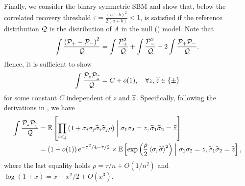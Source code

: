 Finally, we consider the binary symmetric SBM and show that,
below the correlated recovery threshold $\tau=\frac{(a-b)^2}{2(a+b)}<1$, 
  is satisfied if the reference distribution $\mathcal{Q}$ is the distribution of $A$ in
the null (\ER) model. Note that 
$$
\int  \frac{  \left( \mathcal{P}_{+} - \mathcal{P}_{-} \right)^2 }{\mathcal{Q} }  =
\int \frac{\mathcal{P}^2_{+}}{\mathcal{Q}} +\int \frac{\mathcal{P}^2_{-}}{\mathcal{Q}} - 2 \int \frac{ \mathcal{P}_{+} \mathcal{P}_{-} }{ \mathcal{Q}}.
$$
Hence, it is sufficient to show
$$
 \int \frac{ \mathcal{P}_{z} \mathcal{P}_{\widetilde{z} } }{ \mathcal{Q}} =  
C+o(1), \quad  \forall z, \widetilde{z} \in \{\pm \}
$$
for some constant $C$ independent of $z$ and ${\widetilde{z}}$.
Specifically, following the derivations in ,
we have
\begin{align}
\int \frac{   \mathcal{P}_{z}  \mathcal{P}_{{\widetilde{z}}} }{ \mathcal{Q} } 
&= \mathbb{E} \left[   \prod_{i < j} \left(1 +  \sigma_i \sigma_j \widetilde{\sigma}_i \widetilde{\sigma}_j \rho \right)
\mathrel{\bigg|} \sigma_1 \sigma_2=z, \widetilde{\sigma}_1 \widetilde{\sigma}_2 ={\widetilde{z}}  \right]  \nonumber \\
& =  \left( 1+o(1) \right) e^{ -\tau^2/4 -\tau/2} \times 
\mathbb{E} \left[  \exp \left( \frac{\rho}{2} \left \langle  \sigma, \widetilde{\sigma} \right\rangle^2  \right) \mathrel{\Big|} \sigma_1 \sigma_2=z, \widetilde{\sigma}_1 \widetilde{\sigma}_2 ={\widetilde{z}}  \right],
\end{align}
where the last equality holds $\rho=\tau/n + O(1/n^2)$ and $\log(1+x) = x -x^2/2 +O(x^3)$. 

